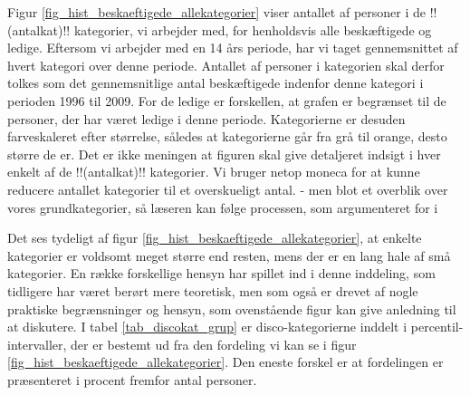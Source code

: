 Figur \ref{fig_hist_beskaeftigede_allekategorier} viser antallet af personer i de !!(antalkat)!! kategorier, vi arbejder med, for henholdsvis alle beskæftigede og ledige. Eftersom vi arbejder med en 14 års periode, har vi taget gennemsnittet af hvert kategori over denne periode. Antallet af personer i kategorien skal derfor tolkes som det gennemsnitlige antal beskæftigede indenfor denne kategori i perioden 1996 til 2009. For de ledige er forskellen, at grafen er begrænset til de personer, der har været ledige i denne periode. Kategorierne er desuden farveskaleret efter størrelse, således at kategorierne går fra grå til orange, desto større de er. Det er ikke meningen at figuren skal give detaljeret indsigt i hver enkelt af de !!(antalkat)!! kategorier. Vi bruger netop moneca for at kunne reducere antallet kategorier til et overskueligt antal. - men blot et overblik over vores grundkategorier, så læseren kan følge processen, som argumenteret for i %




Det ses tydeligt af figur \ref{fig_hist_beskaeftigede_allekategorier}, at enkelte kategorier er voldsomt meget større end resten, mens der er en lang hale af små kategorier. En række forskellige hensyn har spillet ind i denne inddeling, som tidligere har været berørt mere teoretisk, men som også er drevet af nogle praktiske begrænsninger og hensyn, som ovenstående figur kan give anledning til at diskutere. I tabel \ref{tab_discokat_grup} er disco-kategorierne inddelt i percentil-intervaller, der er bestemt ud fra den fordeling vi kan se i figur \ref{fig_hist_beskaeftigede_allekategorier}. Den eneste forskel er at fordelingen er præsenteret i procent fremfor antal personer. %

